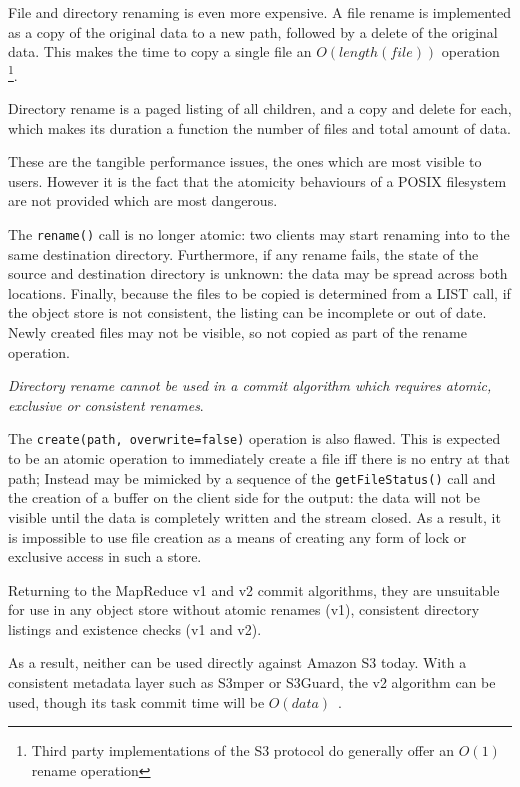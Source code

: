 \documentclass[conference]{IEEEtran}
\begin{document}
File and directory renaming is even more expensive.
A file rename is implemented as a copy of the original data to a new path,
followed by a delete of the original data.
This makes the time to copy a single file an $O(length(file))$ operation
\footnote{Third party implementations of the S3 protocol do generally offer an $O(1)$ rename operation}.

Directory rename is a paged listing of all children, and a copy and delete for
each, which makes its duration a function the number of files and total amount of data.

These are the tangible performance issues, the ones which are most visible
to users.
However it is the fact that the atomicity behaviours of a POSIX filesystem
are not provided which are most dangerous.

The \texttt{rename()} call is no longer atomic: two clients may start renaming
into to the same destination directory.
Furthermore, if any rename fails, the state of the source and destination
directory is unknown: the data may be spread across both locations.
Finally, because the files to be copied is determined from a LIST call,
if the object store is not consistent, the listing can be incomplete or out of
date.
Newly created files may not be visible, so not copied as part of the rename
operation.

\emph{Directory rename cannot be used in a commit algorithm which
requires atomic, exclusive or consistent renames}.

The \texttt{create(path, overwrite=false)} operation is also flawed.
This is expected to be an atomic operation to immediately create a file iff there is
no entry at that path;
Instead may be mimicked by a sequence of the \texttt{getFileStatus()} call
and the creation of a buffer on the client side for the output: the data
will not be visible until the data is completely written and the stream
closed.
As a result, it is impossible to use file creation as a means of creating any
form of lock or exclusive access in such a store.


Returning to the MapReduce v1 and v2 commit algorithms, they are unsuitable for
use in any object store without atomic renames (v1), consistent
directory listings and existence checks (v1 and v2).

As a result, neither can be used directly against Amazon S3 today.
With a consistent metadata layer such as S3mper or S3Guard, the v2 algorithm
can be used, though its task commit time will be $O(data)$\ \cite{S3mper,HADOOP-13345}.
\end{document}
